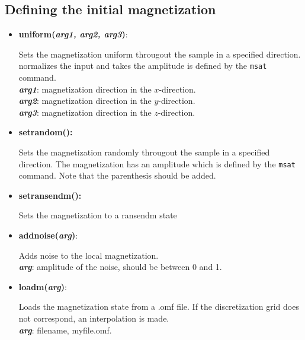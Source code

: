 \subsection{Defining the initial magnetization}


\begin{itemize}
 \item  {\textbf{uniform(\textit{arg1, arg2, arg3})}:
				\flushright\parbox{0.9 \textwidth}{\vspace{-0.25cm} 
				Sets the magnetization uniform througout the sample in a specified direction.  \mumax normalizes the input and takes the amplitude is defined by the \texttt{msat} command.\\
				\textbf{\textit{arg1}}: magnetization direction in the $x$-direction.\\
				\textbf{\textit{arg2}}: magnetization direction in the $y$-direction.\\
				\textbf{\textit{arg3}}: magnetization direction in the $z$-direction.
				}\flushleft}

 \item {\vspace{-0.4cm}\textbf{setrandom():}
				\flushright\parbox{0.9 \textwidth}{\vspace{-0.25cm} 
				Sets the magnetization randomly througout the sample in a specified direction.  The magnetization has an amplitude which is defined by the \texttt{msat} command.  Note that the parenthesis should be added.
				}\flushleft}

 \item {\vspace{-0.4cm}\textbf{setransendm():}
				\flushright\parbox{0.9 \textwidth}{\vspace{-0.25cm} 
				Sets the magnetization to a ransendm state 
				}\flushleft}

 \item {\vspace{-0.4cm}\textbf{addnoise(\textit{arg})}:
				\flushright\parbox{0.9 \textwidth}{\vspace{-0.25cm} 
				Adds noise to the local magnetization. \\
				\textbf{\textit{arg}}: amplitude of the noise, should be between 0 and 1.
				}\flushleft}

 \item {\vspace{-0.4cm}\textbf{loadm(\textit{arg})}:
				\flushright\parbox{0.9 \textwidth}{\vspace{-0.25cm} 
				Loads the magnetization state from a .omf file.  If the discretization grid does not correspond, an interpolation is made.\\
				\textbf{\textit{arg}}: filename, myfile.omf.
				}\flushleft}


\end{itemize}
